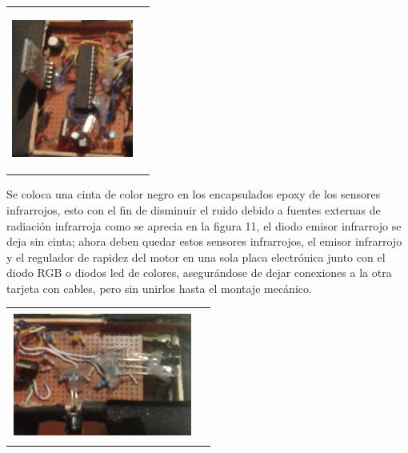 \documentclass[12]{article}
\newenvironment{Figure}
{\par\medskip\noindent\minipage{\linewidth}}
{\endminipage\par\medskip}
\begin{document}
\begin{multicols}{2}
\begin{Figure}
\begin{tabular}{|l|r|}
\hline
\\
\includegraphics[width=4cm, height=5cm]{img/tar_tras.png}  \\\\ \hline
\end{tabular}
\label{fig:g10}
\end{Figure}
Se coloca una cinta de color negro en los encapsulados epoxy de los sensores infrarrojos, esto con el fin de disminuir el ruido debido a fuentes externas de radiación infrarroja como se aprecia en la figura 11, el diodo emisor infrarrojo se deja sin cinta; ahora deben quedar estos sensores infrarrojos, el emisor infrarrojo y el regulador de rapidez del motor en una sola placa electrónica junto con el diodo RGB o diodos led de colores, asegurándose de dejar conexiones a la otra tarjeta con cables, pero sin unirlos hasta el montaje mecánico. 
\begin{Figure}
\center
\begin{tabular}{|l|r|}
\hline
\\
\includegraphics[width=6cm, height=4cm]{img/tar_frontal.png}  \\\\ \hline
\end{tabular}
\label{fig:g11}
\end{Figure}

\end{multicols}
\end{document}
